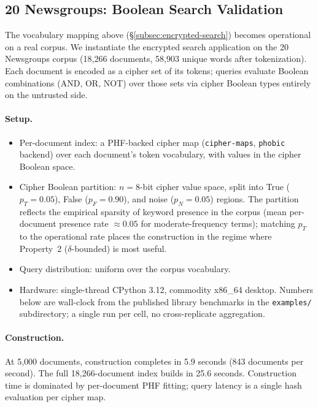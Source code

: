\documentclass[11pt]{article}
\theoremstyle{definition}
\theoremstyle{plain}
\theoremstyle{remark}
\begin{document}
\subsection{20 Newsgroups: Boolean Search Validation}
\label{subsec:eval-20ng}

The vocabulary mapping above (\S\ref{subsec:encrypted-search}) becomes
operational on a real corpus.  We instantiate the encrypted search
application on the 20 Newsgroups corpus (18{,}266 documents, 58{,}903
unique words after tokenization).  Each document is encoded as a
cipher set of its tokens; queries evaluate Boolean combinations (AND,
OR, NOT) over those sets via cipher Boolean types entirely on the
untrusted side.

\paragraph{Setup.}
\begin{itemize}
\item Per-document index: a PHF-backed cipher map (\texttt{cipher-maps},
    \texttt{phobic} backend) over each document's token vocabulary,
    with values in the cipher Boolean space.
\item Cipher Boolean partition: $n = 8$-bit cipher value space, split
    into True ($p_T = 0.05$), False ($p_F = 0.90$), and noise
    ($p_N = 0.05$) regions.  The partition reflects the empirical
    sparsity of keyword presence in the corpus (mean per-document
    presence rate $\approx 0.05$ for moderate-frequency terms);
    matching $p_T$ to the operational rate places the construction
    in the regime where Property~2 ($\delta$-bounded) is most useful.
\item Query distribution: uniform over the corpus vocabulary.
\item Hardware: single-thread CPython 3.12, commodity x86\_64 desktop.
    Numbers below are wall-clock from the published library benchmarks
    in the \texttt{examples/} subdirectory; a single run per cell, no
    cross-replicate aggregation.
\end{itemize}

\paragraph{Construction.}
At 5{,}000 documents, construction completes in 5.9 seconds (843
documents per second).  The full 18{,}266-document index builds in
25.6 seconds.  Construction time is dominated by per-document PHF
fitting; query latency is a single hash evaluation per cipher map.
\end{document}
